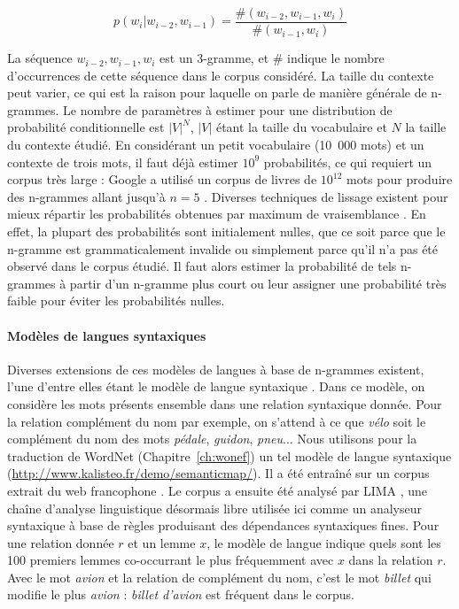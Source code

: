 \[
p(w_i|w_{i-2}, w_{i-1}) = \frac{\#(w_{i-2}, w_{i-1}, w_i)}{\#(w_{i-1}, w_i)}
\]

La séquence $w_{i-2}, w_{i-1}, w_{i}$ est un 3-gramme, et $\#$ indique le
nombre d'occurrences de cette séquence dans le corpus considéré. La taille du
contexte peut varier, ce qui est la raison pour laquelle on parle de manière
générale de n-grammes. Le nombre de paramètres à estimer pour une distribution
de probabilité conditionnelle est $|V|^N$, $|V|$ étant la taille du vocabulaire
et $N$ la taille du contexte étudié. En considérant un petit vocabulaire
(10~000 mots) et un contexte de trois mots, il faut déjà estimer $10^{9}$
probabilités, ce qui requiert un corpus très large : Google a utilisé un corpus
de livres de $10^{12}$ mots pour produire des n-grammes allant jusqu'à $n=5$
\citep{brants2006web}. Diverses techniques de lissage existent pour mieux
répartir les probabilités obtenues par maximum de vraisemblance
\citep[Chapitre~4]{jurafsky2008speech}. En effet, la plupart des probabilités
sont initialement nulles, que ce soit parce que le n-gramme est
grammaticalement invalide ou simplement parce qu'il n'a pas été observé dans le
corpus étudié. Il faut alors estimer la probabilité de tels n-grammes à partir
d'un n-gramme plus court ou leur assigner une probabilité très faible pour
éviter les probabilités nulles.

\paragraph{Modèles de langues syntaxiques} Diverses extensions de ces modèles
de langues à base de n-grammes existent, l'une d'entre elles étant le modèle de
langue syntaxique \citep{lin1998automatic,goldberg2013dataset}. Dans ce modèle,
on considère les mots présents ensemble dans une relation syntaxique donnée.
Pour la relation complément du nom par exemple, on s'attend à ce que
\textit{vélo} soit le complément du nom des mots \textit{pédale},
\textit{guidon}, \textit{pneu}... Nous utilisons pour la traduction de WordNet
(Chapitre~\ref{ch:wonef}) un tel modèle de langue syntaxique
(\url{http://www.kalisteo.fr/demo/semanticmap/}).  Il a été entraîné sur un
corpus extrait du web francophone \citep{grefenstette2007conquering}. Le corpus
a ensuite été analysé par LIMA \citep{besancon2010lima}, une chaîne d'analyse
linguistique désormais libre utilisée ici comme un analyseur syntaxique à base
de règles produisant des dépendances syntaxiques fines. Pour une relation
donnée $r$ et un lemme $x$, le modèle de langue indique quels sont les 100
premiers lemmes co-occurrant le plus fréquemment avec $x$ dans la relation $r$.
Avec le mot \textit{avion} et la relation de complément du nom, c'est le mot
\textit{billet} qui modifie le plus \textit{avion} : \textit{billet d'avion}
est fréquent dans le corpus.


